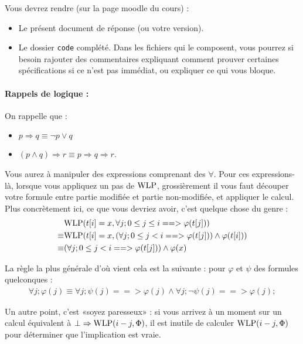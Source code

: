 \documentclass[11pt,answers]{exam}
\begin{document}
Vous devrez rendre (sur la page moodle du cours) :
\begin{itemize}
    \item Le présent document de réponse (ou votre version).
    \item Le dossier \texttt{code} complété. Dans les fichiers qui le composent, vous pourrez si besoin rajouter des commentaires expliquant comment prouver certaines spécifications si ce n’est pas immédiat, ou expliquer ce qui vous bloque.
\end{itemize}


\paragraph{Rappels de logique :}

On rappelle que :
\begin{itemize}
    \item $p \Rightarrow q \equiv \neg p \vee q$
    \item $(p \wedge q) \Rightarrow r \equiv p \Rightarrow q \Rightarrow r$.
\end{itemize}

Vous aurez à manipuler des expressions comprenant des $\forall$. Pour ces expressions-là, lorsque vous appliquez un pas de $\mathrm{WLP}$, grossièrement il vous faut découper votre formule entre partie modifiée et partie non-modifiée, et appliquer le calcul. Plus concrètement ici, ce que vous devriez avoir, c’est quelque chose du genre :
\begin{align*}
           & \mathrm{WLP}(t[i] = x,\forall j; 0 \leq j \leq i ==> \varphi(t[j]))                     \\
    \equiv & \mathrm{WLP}(t[i] = x,(\forall j; 0 \leq j < i ==> \varphi(t[j])) \wedge \varphi(t[i])) \\
    \equiv & (\forall j; 0 \leq j < i ==> \varphi(t[j])) \wedge \varphi(x)
\end{align*}

La règle la plus générale d’où vient cela est la suivante : pour $\varphi$ et $\psi$ des formules quelconques :
\begin{align*}
    \forall j; \varphi(j) \equiv \forall j; \psi(j) ==> \varphi(j) \wedge \forall j; \neg \psi(j) ==> \varphi(j);
\end{align*}

Un autre point, c’est «soyez paresseux» : si vous arrivez à un moment sur un calcul équivalent à $\bot \Rightarrow \mathrm{WLP}(i-j,\Phi)$, il est inutile de calculer $\mathrm{WLP}(i-j,\Phi)$ pour déterminer que l’implication est vraie.
\end{document}
